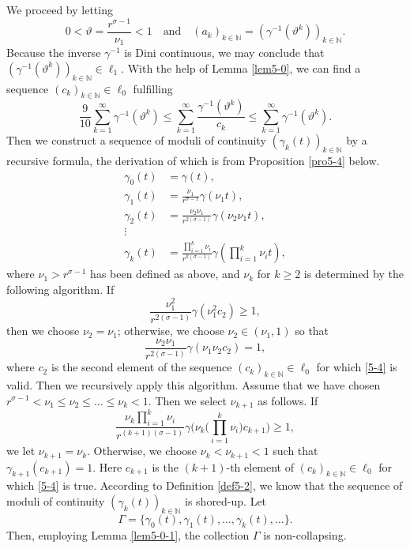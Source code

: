 \documentclass[11pt,reqno]{amsart}
\numberwithin{equation}{section}
\begin{document}
We proceed by letting
$$
0<\vartheta=\frac{r^{\sigma-1}}{\nu_1}<1
\quad\text{and}\quad
(a_k)_{k\in\mathbb{N}}=(\gamma^{-1}(\vartheta^k))_{k\in\mathbb{N}}.
$$
Because the inverse $\gamma^{-1}$ is Dini continuous, we may conclude that $(\gamma^{-1}(\vartheta^k))_{k\in\mathbb{N}}\in\ell_1$. With the help of Lemma \ref{lem5-0}, we can find a sequence $(c_k)_{k\in\mathbb{N}}\in \ell_0$ %
fulfilling
\begin{equation}
\label{5-4}
\frac{9}{10}\sum^\infty_{k=1}\gamma^{-1}(\vartheta^k)\le \sum^\infty_{k=1}\frac{\gamma^{-1}(\vartheta^k)}{c_k}\le
\sum^\infty_{k=1}\gamma^{-1}(\vartheta^k).
\end{equation}
Then we construct a sequence of moduli of continuity $(\gamma_k(t))_{k\in\mathbb{N}}$ by a recursive formula, the derivation of which is from Proposition \ref{pro5-4} below.
\begin{align*}
\gamma_0(t)&=\gamma(t),\\
\gamma_1(t)&=\frac{\nu_1}{r^{\sigma-1}}\gamma(\nu_1t),\\
\gamma_2(t)&=\frac{\nu_2\nu_1}{r^{2(\sigma-1)}}\gamma(\nu_2\nu_1t),\\
 \vdots \\
\gamma_k(t)&=\frac{\prod^k_{i=1}\nu_i}{r^{k(\sigma-1)}}\gamma\left(\prod^k_{i=1}\nu_it\right),
\end{align*}
where $\nu_1>r^{\sigma-1}$ has been defined as above, and $\nu_k$ for $k\ge2$ is determined by the following algorithm. If
$$
\frac{\nu_1^2}{r^{2(\sigma-1)}}\gamma(\nu_1^2c_2)\ge1,
$$
then we choose $\nu_2=\nu_1$; otherwise, we choose $\nu_2\in(\nu_1,1)$ so that
$$
\frac{\nu_2\nu_1}{r^{2(\sigma-1)}}\gamma(\nu_1\nu_2c_2)=1,
$$
where $c_2$ is the second element of the sequence $(c_k)_{k\in\mathbb{N}}\in \ell_0$ for which \eqref{5-4} is valid. Then we recursively apply this algorithm.
Assume that we have chosen $r^{\sigma-1}<\nu_1\le \nu_2\le\dots\le\nu_k<1$.
Then we select $\nu_{k+1}$ as follows. If
$$
\frac{\nu_k\prod^k_{i=1}\nu_i}{r^{(k+1)(\sigma-1)}}\gamma\biggl(\nu_k\biggl(\prod^k_{i=1}\nu_i\biggr)c_{k+1}\biggr)\ge1,
$$
we let $\nu_{k+1}=\nu_k$. Otherwise, we choose $\nu_k<\nu_{k+1}<1$ such that $\gamma_{k+1}(c_{k+1})=1$. Here $c_{k+1}$ is the $(k+1)$-th element of $(c_k)_{k\in\mathbb{N}}\in \ell_0$ for which \eqref{5-4} is true. According to Definition \ref{def5-2}, we know that the sequence of moduli of continuity $(\gamma_k(t))_{k\in\mathbb{N}}$ is shored-up. Let
$$
\Gamma=\{\gamma_0(t),\gamma_1(t),\dots,\gamma_k(t),\dots\}.
$$
Then, employing Lemma \ref{lem5-0-1}, the collection $\Gamma$ is non-collapsing.
\end{document}
